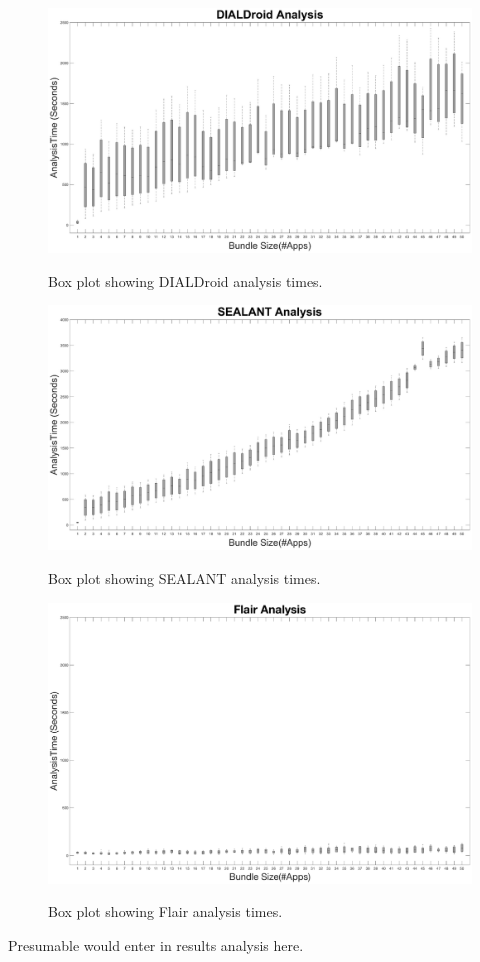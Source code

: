 \documentclass[twocolumn]{article}
\begin{document}
\begin{figure}[hb!]
	\includegraphics[width=\textwidth]{DIALDroidBoxPlot}
	\label{figure:3}
	\caption{Box plot showing DIALDroid analysis times.}
\end{figure}
\begin{figure}[hb!]
	\includegraphics[width=\textwidth]{SEALANTBoxPlot}
	\label{figure:4}
	\caption{Box plot showing SEALANT analysis times.}
\end{figure}
\begin{figure}[hb!]
	\includegraphics[width=\textwidth]{FlairBoxPlot}
	\label{figure:5}
	\caption{Box plot showing Flair analysis times.}
\end{figure}
\twocolumn
Presumable would enter in results analysis here.
\end{document}
